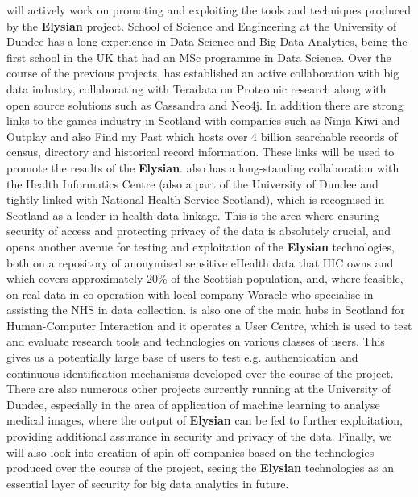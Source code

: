 \documentclass[a4paper,11pt]{article}
\newcommand{\project}[1]{\textbf{#1}\xspace}
\newcommand{\SECURITY}{\project{Elysian}}
\newcommand{\TheProject}{\SECURITY}
\begin{document}
\UODshort{} will actively work on promoting and exploiting the tools and techniques produced by the \TheProject{} project. School of Science and Engineering at the University of Dundee has a long experience in Data Science and Big Data Analytics, being the first school in the UK that had an MSc programme in Data Science. Over the course of the previous projects, \UOD has established an active collaboration with big data industry, collaborating with Teradata  on Proteomic research along with open source solutions such as Cassandra and Neo4j. In addition there are strong links to the games industry in Scotland with companies such as Ninja Kiwi and Outplay and also Find my Past which hosts over 4 billion searchable records of census, directory and historical record information. These links will be used to promote the results of the \TheProject{}. \UOD also has a long-standing collaboration with the Health Informatics Centre (also a part of the University of Dundee and tightly linked with National Health Service Scotland), which is recognised in Scotland as a leader in health data linkage. This is the area where ensuring security of access and protecting privacy of the data is absolutely crucial, and opens another avenue for testing and exploitation of the \TheProject{} technologies, both on a repository of anonymised sensitive eHealth data that HIC owns and which covers approximately 20\% of the Scottish population, and, where feasible, on real data in co-operation with local company Waracle who specialise in assisting the NHS in data collection. \UODshort{} is also one of the main hubs in Scotland for Human-Computer Interaction and it operates a User Centre, which is used to test and evaluate research tools and technologies on various classes of users. This gives us a potentially large base of users to test e.g. authentication and continuous identification mechanisms developed over the course of the project. There are also numerous other projects currently running at the University of Dundee, especially in the area of application of machine learning to analyse medical images, where the output of \TheProject{} can be fed to further exploitation, providing additional assurance in security and privacy of the data. Finally, we will also look into creation of spin-off companies based on the technologies produced over the course of the project, seeing the \TheProject{} technologies as an essential layer of security for big data analytics in future.
\end{document}
